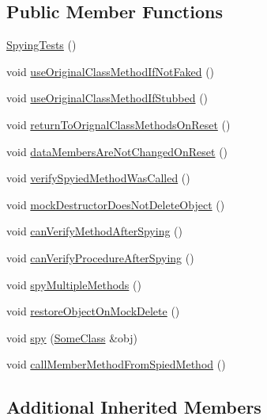 \subsection*{Public Member Functions}
\begin{DoxyCompactItemize}
\item 
\mbox{\hyperlink{structSpyingTests_a605e61a7666df44b0fbe533b435641d0}{Spying\+Tests}} ()
\item 
void \mbox{\hyperlink{structSpyingTests_ac266f68a7fdc7f48d8ed1d5a056c07a0}{use\+Original\+Class\+Method\+If\+Not\+Faked}} ()
\item 
void \mbox{\hyperlink{structSpyingTests_ab3fc1cd917953a7fdd42e590343bde12}{use\+Original\+Class\+Method\+If\+Stubbed}} ()
\item 
void \mbox{\hyperlink{structSpyingTests_aab3c1ec3eec0ea1093ca6a841b5f9dbb}{return\+To\+Orignal\+Class\+Methods\+On\+Reset}} ()
\item 
void \mbox{\hyperlink{structSpyingTests_a159bcf12100aa0cba2121a628875ba4a}{data\+Members\+Are\+Not\+Changed\+On\+Reset}} ()
\item 
void \mbox{\hyperlink{structSpyingTests_a81a2b9751ad62818f62bd59109a358b9}{verify\+Spyied\+Method\+Was\+Called}} ()
\item 
void \mbox{\hyperlink{structSpyingTests_a816d7f91f7c1b3387aa2e7f49c4f35a4}{mock\+Destructor\+Does\+Not\+Delete\+Object}} ()
\item 
void \mbox{\hyperlink{structSpyingTests_ae131d8f4d4ea924e589ff6b007791d03}{can\+Verify\+Method\+After\+Spying}} ()
\item 
void \mbox{\hyperlink{structSpyingTests_a0f33b6669ece553344ffc282b886894f}{can\+Verify\+Procedure\+After\+Spying}} ()
\item 
void \mbox{\hyperlink{structSpyingTests_aa8d6fdba9115912eebcdc81bccac5062}{spy\+Multiple\+Methods}} ()
\item 
void \mbox{\hyperlink{structSpyingTests_a67e3797aa021c5a86ae8e2e6386c10ef}{restore\+Object\+On\+Mock\+Delete}} ()
\item 
void \mbox{\hyperlink{structSpyingTests_a599bcffe76bcd576025b8577dfafe7b2}{spy}} (\mbox{\hyperlink{classSpyingTests_1_1SomeClass}{Some\+Class}} \&obj)
\item 
void \mbox{\hyperlink{structSpyingTests_af41d6a6b40956bb4cdfa2f0ad70e8d08}{call\+Member\+Method\+From\+Spied\+Method}} ()
\end{DoxyCompactItemize}
\subsection*{Additional Inherited Members}


